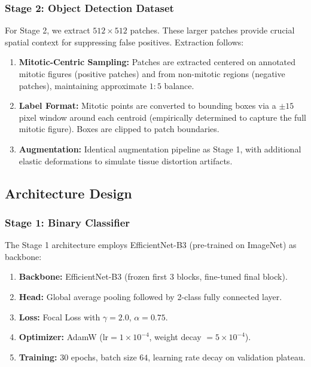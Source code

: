 \documentclass[journal]{IEEEtran}
\begin{document}
\subsubsection{Stage 2: Object Detection Dataset}
For Stage 2, we extract $512 \times 512$ patches. These larger patches provide crucial spatial context for suppressing false positives. Extraction follows:

\begin{enumerate}
\item \textbf{Mitotic-Centric Sampling:} Patches are extracted centered on annotated mitotic figures (positive patches) and from non-mitotic regions (negative patches), maintaining approximate $1:5$ balance.
\item \textbf{Label Format:} Mitotic points are converted to bounding boxes via a $\pm 15$ pixel window around each centroid (empirically determined to capture the full mitotic figure). Boxes are clipped to patch boundaries.
\item \textbf{Augmentation:} Identical augmentation pipeline as Stage 1, with additional elastic deformations to simulate tissue distortion artifacts.
\end{enumerate}

\subsection{Architecture Design}

\subsubsection{Stage 1: Binary Classifier}
The Stage 1 architecture employs EfficientNet-B3 (pre-trained on ImageNet) as backbone:

\begin{enumerate}
\item \textbf{Backbone:} EfficientNet-B3 (frozen first 3 blocks, fine-tuned final block).
\item \textbf{Head:} Global average pooling followed by 2-class fully connected layer.
\item \textbf{Loss:} Focal Loss with $\gamma = 2.0$, $\alpha = 0.75$.
\item \textbf{Optimizer:} AdamW ($\text{lr} = 1 \times 10^{-4}$, weight decay $= 5 \times 10^{-4}$).
\item \textbf{Training:} $30$ epochs, batch size $64$, learning rate decay on validation plateau.
\end{enumerate}
\end{document}

